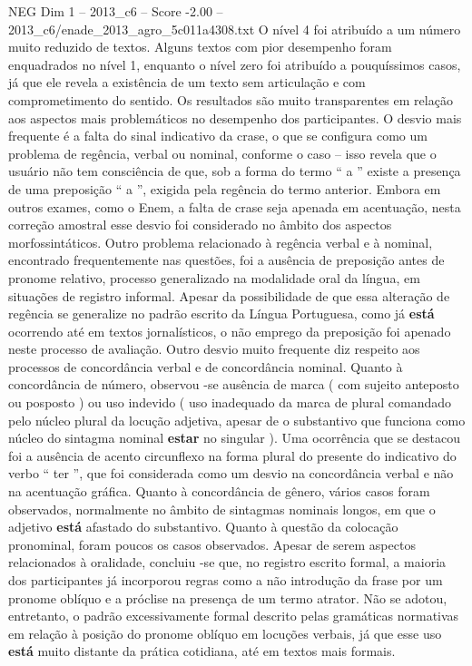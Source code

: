 \begin{textsample}{NEG Dim 1 – 2013\_c6 – Score -2.00 – 2013\_c6/enade\_2013\_agro\_5c011a4308.txt}
O nível 4 foi atribuído a um número muito reduzido de textos.
Alguns textos com pior desempenho foram enquadrados no nível 1, enquanto o nível zero foi atribuído a pouquíssimos casos, já que ele revela a existência de um texto sem articulação e com comprometimento do sentido.
Os resultados são muito transparentes em relação aos aspectos mais problemáticos no desempenho dos participantes.
O desvio mais frequente é a falta do sinal indicativo da crase, o que se configura como um problema de regência, verbal ou nominal, conforme o caso – isso revela que o usuário não tem consciência de que, sob a forma do termo “ a ” existe a presença de uma preposição “ a ”, exigida pela regência do termo anterior.
Embora em outros exames, como o Enem, a falta de crase seja apenada em acentuação, nesta correção amostral esse desvio foi considerado no âmbito dos aspectos morfossintáticos.
Outro problema relacionado à regência verbal e à nominal, encontrado frequentemente nas questões, foi a ausência de preposição antes de pronome relativo, processo generalizado na modalidade oral da língua, em situações de registro informal.
Apesar da possibilidade de que essa alteração de regência se generalize no padrão escrito da Língua Portuguesa, como já \textbf{está} ocorrendo até em textos jornalísticos, o não emprego da preposição foi apenado neste processo de avaliação.
Outro desvio muito frequente diz respeito aos processos de concordância verbal e de concordância nominal.
Quanto à concordância de número, observou -se ausência de marca ( com sujeito anteposto ou posposto ) ou uso indevido ( uso inadequado da marca de plural comandado pelo núcleo plural da locução adjetiva, apesar de o substantivo que funciona como núcleo do sintagma nominal \textbf{estar} no singular ).
Uma ocorrência que se destacou foi a ausência de acento circunflexo na forma plural do presente do indicativo do verbo “ ter ”, que foi considerada como um desvio na concordância verbal e não na acentuação gráfica.
Quanto à concordância de gênero, vários casos foram observados, normalmente no âmbito de sintagmas nominais longos, em que o adjetivo \textbf{está} afastado do substantivo.
Quanto à questão da colocação pronominal, foram poucos os casos observados.
Apesar de serem aspectos relacionados à oralidade, concluiu -se que, no registro escrito formal, a maioria dos participantes já incorporou regras como a não introdução da frase por um pronome oblíquo e a próclise na presença de um termo atrator.
Não se adotou, entretanto, o padrão excessivamente formal descrito pelas gramáticas normativas em relação à posição do pronome oblíquo em locuções verbais, já que esse uso \textbf{está} muito distante da prática cotidiana, até em textos mais formais.

\end{textsample}
